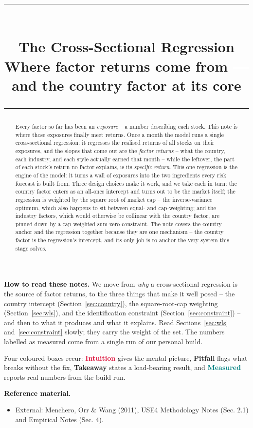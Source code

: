\documentclass[11pt]{article}
\title{\vspace{-2.2em}
  {\color{steel}\rule{\textwidth}{1.3pt}}\\[0.7em]
  \Huge\bfseries The Cross-Sectional Regression\\[0.35em]
  \large\mdseries Where factor returns come from --- and the country factor at its core\\[0.4em]
  {\color{steel}\rule{\textwidth}{0.7pt}}}
\author{}
\date{}
\theoremstyle{definition}
\theoremstyle{plain}
\theoremstyle{remark}
\begin{document}
\maketitle
\thispagestyle{empty}

\begin{abstract}
Every factor so far has been an \emph{exposure} -- a number describing each stock. This note is where those exposures finally meet returns. Once a month the model runs a single cross-sectional regression: it regresses the realised returns of all stocks on their exposures, and the slopes that come out are the \emph{factor returns} -- what the country, each industry, and each style actually earned that month -- while the leftover, the part of each stock's return no factor explains, is its \emph{specific return}. This one regression is the engine of the model: it turns a wall of exposures into the two ingredients every risk forecast is built from. Three design choices make it work, and we take each in turn: the country factor enters as an all-ones intercept and turns out to be the market itself; the regression is weighted by the square root of market cap -- the inverse-variance optimum, which also happens to sit between equal- and cap-weighting; and the industry factors, which would otherwise be collinear with the country factor, are pinned down by a cap-weighted-sum-zero constraint. The note covers the country anchor and the regression together because they are one mechanism -- the country factor is the regression's intercept, and its only job is to anchor the very system this stage solves.
\end{abstract}

\begin{tcolorbox}[colback=paperlt,colframe=ink!30,boxrule=0.4pt,arc=2pt,left=10pt,right=10pt,top=8pt,bottom=8pt]
\textbf{How to read these notes.} We move from \emph{why} a cross-sectional regression is the source of factor returns, to the three things that make it well posed -- the country intercept (Section~\ref{sec:country}), the square-root-cap weighting (Section~\ref{sec:wls}), and the identification constraint (Section~\ref{sec:constraint}) -- and then to what it produces and what it explains. Read Sections~\ref{sec:wls} and~\ref{sec:constraint} slowly; they carry the weight of the set. The numbers labelled as measured come from a single run of our personal build.

\smallskip
Four coloured boxes recur: \textcolor{crimson}{\textbf{Intuition}} gives the mental picture, \textcolor{amber}{\textbf{Pitfall}} flags what breaks without the fix, \textcolor{steel}{\textbf{Takeaway}} states a load-bearing result, and \textcolor{teal}{\textbf{Measured}} reports real numbers from the build run.

\smallskip
\textbf{Reference material.}
\begin{itemize}[leftmargin=1.4em,topsep=2pt]
  \item External: Menchero, Orr \& Wang (2011), USE4 Methodology Notes (Sec. 2.1) and Empirical Notes (Sec. 4).
\end{itemize}
\end{tcolorbox}
\end{document}

